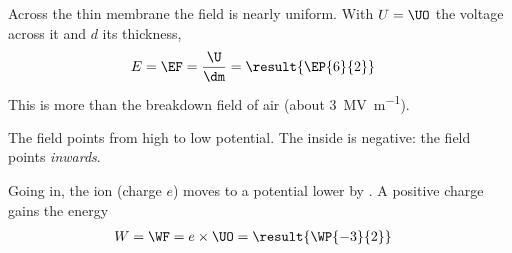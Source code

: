 \begin{abcliste}
\abc Across the thin membrane the field is nearly uniform. With $U = \UO$ the voltage across it and $d$ its thickness,
\begin{align}
 E &= \EF = \frac{\U}{\dm} = \result{\EP{6}{2}}
\end{align}
This is more than the breakdown field of air (about \SI{3}{\mega\volt\per\meter}).

\abc The field points from high to low potential. The inside is negative: the field points \emph{inwards}.

\abc Going in, the  ion (charge $e$) moves to a potential lower by \UO. A positive charge gains the energy
\begin{align}
 W &= \WF = e\times\UO = \result{\WP{-3}{2}}
\end{align}
\end{abcliste}
